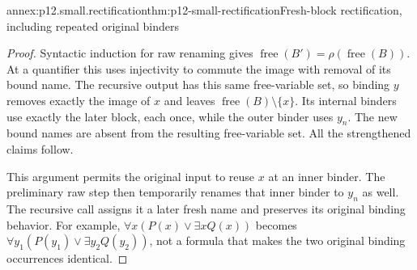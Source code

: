 \begin{annexitem}{annex:p12.small.rectification}{thm:p12-small-rectification}{Fresh-block rectification, including repeated original binders}
\begin{proof}
Syntactic induction for raw renaming gives
\(\operatorname{free}(B')=
\rho(\operatorname{free}(B))\). At a quantifier this uses
injectivity to commute the image with removal of its bound name.
The recursive output has this same free-variable set, so binding
\(y\) removes exactly the image of \(x\) and leaves
\(\operatorname{free}(B)\setminus\{x\}\).
Its internal binders use exactly the later block, each once, while
the outer binder uses \(y_n\). The new bound names are absent
from the resulting free-variable set. All the strengthened claims
follow.

This argument permits the original input to reuse \(x\) at an
inner binder. The preliminary raw step then temporarily renames
that inner binder to \(y_n\) as well. The recursive call assigns
it a later fresh name and preserves its original binding behavior.
For example, \(\forall x(P(x)\lor\exists x Q(x))\) becomes
\(\forall y_1(P(y_1)\lor\exists y_2 Q(y_2))\), not a formula
that makes the two original binding occurrences identical.
\end{proof}
\end{annexitem}

